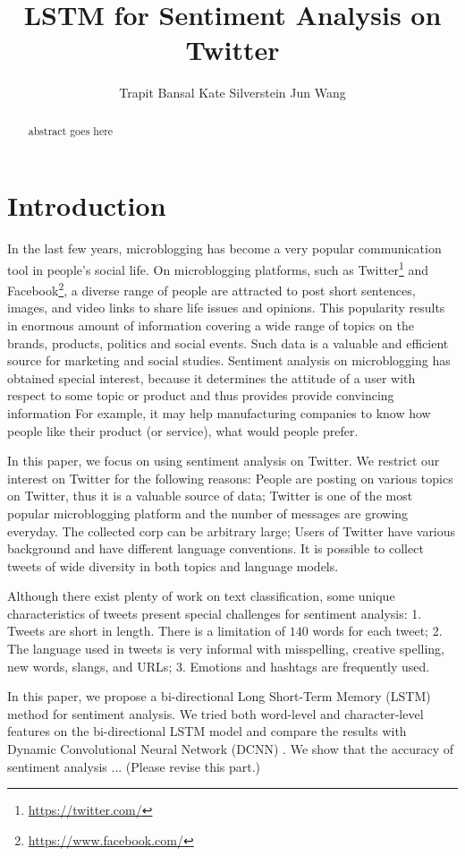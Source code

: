 \documentclass{article} %
\title{LSTM for Sentiment Analysis on Twitter}
\author{
Trapit Bansal
\And
Kate Silverstein
\And
Jun Wang
}
\begin{document}
\maketitle

\begin{abstract}
abstract goes here
\end{abstract}

\section{Introduction}
In the last few years, microblogging has become a very popular communication tool in people's social life.
On microblogging platforms, such as Twitter\footnote{\url{https://twitter.com/}} and Facebook\footnote{\url{https://www.facebook.com/}}, a diverse range of people are attracted to post short sentences, images, and video links to share life issues and opinions.
This popularity results in enormous amount of information covering a wide range of topics on the brands, products, politics and social events. 
Such data is a valuable and efficient source for marketing and social studies. 
Sentiment analysis on microblogging has obtained special interest, because it determines the attitude of a user with respect to some topic or product and thus provides provide convincing information
For example, it may help manufacturing companies to know how people like their product (or service), what would people prefer.  

In this paper, we focus on using sentiment analysis on Twitter. 
We restrict our interest on Twitter for the following reasons: 
People are posting on various topics on Twitter, thus it is a valuable source of data; Twitter is one of the most popular microblogging platform and the number of messages are growing everyday. The collected corp can be arbitrary large; Users of Twitter have various background and have different language conventions. It is possible to collect tweets of wide diversity in both topics and language models.

Although there exist plenty of work on text classification, some unique characteristics of tweets present special challenges for sentiment analysis:
1. Tweets are short in length. There is a limitation of $140$ words for each tweet; 2. The language used in tweets is very informal with misspelling, creative spelling,  new words, slangs, and URLs; 3. Emotions and hashtags are frequently used.

In this paper, we propose a bi-directional Long Short-Term Memory (LSTM) method for sentiment analysis. We tried both word-level and character-level features on the bi-directional LSTM model and compare the results with Dynamic Convolutional Neural Network (DCNN) \cite{kalchbrenner2014convolutional}.
We show that the accuracy of sentiment analysis ... (Please revise this part.)
\end{document}
